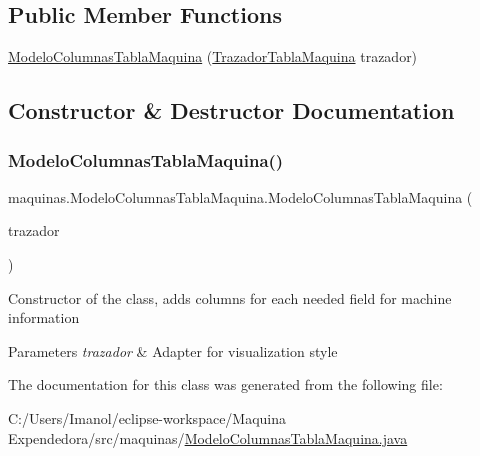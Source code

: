 \subsection*{Public Member Functions}
\begin{DoxyCompactItemize}
\item 
\mbox{\hyperlink{classmaquinas_1_1_modelo_columnas_tabla_maquina_aa6c7c956069c990f37b1867decb1581b}{Modelo\+Columnas\+Tabla\+Maquina}} (\mbox{\hyperlink{classmaquinas_1_1_trazador_tabla_maquina}{Trazador\+Tabla\+Maquina}} trazador)
\end{DoxyCompactItemize}


\subsection{Constructor \& Destructor Documentation}
\mbox{\label{classmaquinas_1_1_modelo_columnas_tabla_maquina_aa6c7c956069c990f37b1867decb1581b}} 
\subsubsection{\texorpdfstring{Modelo\+Columnas\+Tabla\+Maquina()}{ModeloColumnasTablaMaquina()}}
{\footnotesize\ttfamily maquinas.\+Modelo\+Columnas\+Tabla\+Maquina.\+Modelo\+Columnas\+Tabla\+Maquina (\begin{DoxyParamCaption}\item[{\mbox{\hyperlink{classmaquinas_1_1_trazador_tabla_maquina}{Trazador\+Tabla\+Maquina}}}]{trazador }\end{DoxyParamCaption})}

Constructor of the class, adds columns for each needed field for machine information 
\begin{DoxyParams}{Parameters}
{\em trazador} & Adapter for visualization style \\
\hline
\end{DoxyParams}


The documentation for this class was generated from the following file\+:\begin{DoxyCompactItemize}
\item 
C\+:/\+Users/\+Imanol/eclipse-\/workspace/\+Maquina Expendedora/src/maquinas/\mbox{\hyperlink{_modelo_columnas_tabla_maquina_8java}{Modelo\+Columnas\+Tabla\+Maquina.\+java}}\end{DoxyCompactItemize}
